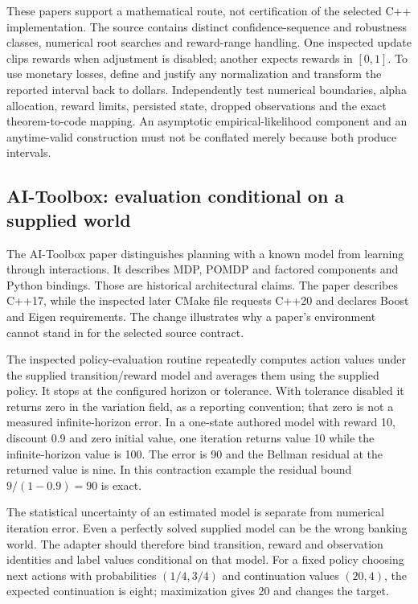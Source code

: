 These papers support a mathematical route, not certification of the selected C++ implementation. The source contains distinct confidence-sequence and robustness classes, numerical root searches and reward-range handling. One inspected update clips rewards when adjustment is disabled; another expects rewards in $[0,1]$. To use monetary losses, define and justify any normalization and transform the reported interval back to dollars. Independently test numerical boundaries, alpha allocation, reward limits, persisted state, dropped observations and the exact theorem-to-code mapping. An asymptotic empirical-likelihood component and an anytime-valid construction must not be conflated merely because both produce intervals.\citep{exec24_policycxx_vw,exec24_policycxx_cs2021,exec24_policycxx_anytime2024,exec24_policycxx_comparison}

\subsection{AI-Toolbox: evaluation conditional on a supplied world}
The AI-Toolbox paper distinguishes planning with a known model from learning through interactions. It describes MDP, POMDP and factored components and Python bindings. Those are historical architectural claims. The paper describes C++17, while the inspected later CMake file requests C++20 and declares Boost and Eigen requirements. The change illustrates why a paper's environment cannot stand in for the selected source contract.\citep{exec24_policycxx_aitoolbox_paper,exec24_policycxx_aitoolbox}

The inspected policy-evaluation routine repeatedly computes action values under the supplied transition/reward model and averages them using the supplied policy. It stops at the configured horizon or tolerance. With tolerance disabled it returns zero in the variation field, as a reporting convention; that zero is not a measured infinite-horizon error. In a one-state authored model with reward 10, discount 0.9 and zero initial value, one iteration returns value 10 while the infinite-horizon value is 100. The error is 90 and the Bellman residual at the returned value is nine. In this contraction example the residual bound $9/(1-0.9)=90$ is exact.\citep{exec24_policycxx_aitoolbox,exec24_policycxx_comparison}

The statistical uncertainty of an estimated model is separate from numerical iteration error. Even a perfectly solved supplied model can be the wrong banking world. The adapter should therefore bind transition, reward and observation identities and label values conditional on that model. For a fixed policy choosing next actions with probabilities $(1/4,3/4)$ and continuation values $(20,4)$, the expected continuation is eight; maximization gives 20 and changes the target.\citep{exec24_policycxx_comparison}

